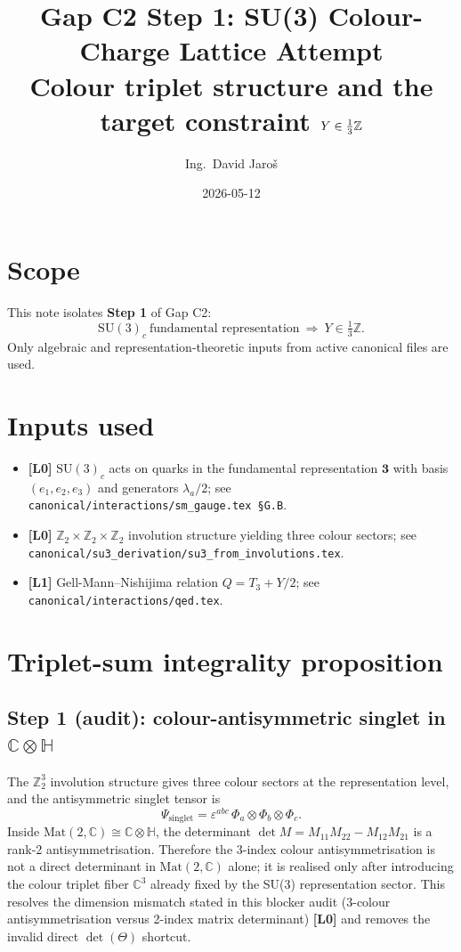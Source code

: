 \documentclass[12pt,a4paper]{article}
\title{\textbf{Gap C2 Step 1: SU(3) Colour-Charge Lattice Attempt}\\
\large Colour triplet structure and the target constraint $Y\in \frac{1}{3}\ZZ$}
\author{Ing.\ David Jaroš}
\date{2026-05-12}
\theoremstyle{remark}
\newcommand{\CC}{\mathbb{C}}
\newcommand{\HH}{\mathbb{H}}
\newcommand{\ZZ}{\mathbb{Z}}
\begin{document}
\maketitle

\section*{Scope}
This note isolates \textbf{Step 1} of Gap C2:
\[
\mathrm{SU}(3)_c\ \text{fundamental representation}
\ \Longrightarrow\
Y\in \tfrac{1}{3}\ZZ.
\]
Only algebraic and representation-theoretic inputs from active canonical files are used.

\section{Inputs used}
\begin{itemize}
  \item \textbf{[L0]} $\mathrm{SU}(3)_c$ acts on quarks in the fundamental representation $\mathbf{3}$ with basis $(e_1,e_2,e_3)$ and generators $\lambda_a/2$; see \texttt{canonical/interactions/sm\_gauge.tex §G.B}.
  \item \textbf{[L0]} $\ZZ_2\times \ZZ_2\times \ZZ_2$ involution structure yielding three colour sectors; see \texttt{canonical/su3\_derivation/su3\_from\_involutions.tex}.
  \item \textbf{[L1]} Gell-Mann--Nishijima relation $Q=T_3+Y/2$; see \texttt{canonical/interactions/qed.tex}.
\end{itemize}

\section{Triplet-sum integrality proposition}
\subsection*{Step 1 (audit): colour-antisymmetric singlet in $\CC\otimes\HH$}
The $\ZZ_2^3$ involution structure gives three colour sectors at the representation level,
and the antisymmetric singlet tensor is
\[
\Psi_{\mathrm{singlet}}=\varepsilon^{abc}\,\Phi_a\otimes\Phi_b\otimes\Phi_c.
\]
Inside $\mathrm{Mat}(2,\CC)\cong \CC\otimes\HH$, the determinant
\(
\det M=M_{11}M_{22}-M_{12}M_{21}
\)
is a rank-2 antisymmetrisation. Therefore the 3-index colour antisymmetrisation is not a direct
determinant in $\mathrm{Mat}(2,\CC)$ alone; it is realised only after introducing the colour triplet
fiber $\CC^3$ already fixed by the SU(3) representation sector.
This resolves the dimension mismatch stated in this blocker audit (3-colour antisymmetrisation versus
2-index matrix determinant) \textbf{[L0]} and removes the invalid direct $\det(\Theta)$ shortcut.
\end{document}
